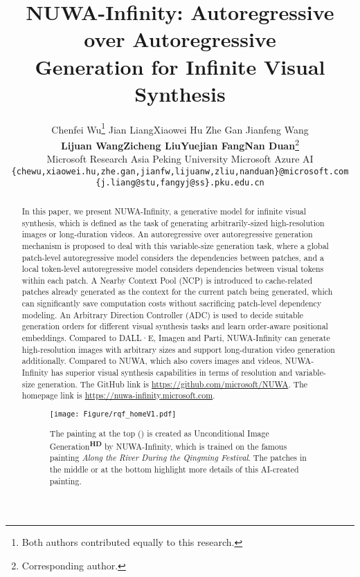 \documentclass{article}
\title{NUWA-Infinity: Autoregressive over Autoregressive\\ Generation for Infinite Visual Synthesis}
\author{Chenfei Wu\thanks{Both authors contributed equally to this research.} \quad Jian Liang\samethanks[1] \quad Xiaowei Hu \quad  Zhe Gan \quad Jianfeng Wang\\ \textbf{Lijuan Wang}\quad  \textbf{Zicheng Liu}\quad  \textbf{Yuejian Fang}\quad \textbf{Nan Duan}\thanks{Corresponding author.} \\
 {Microsoft Research Asia \quad Peking University
 \quad Microsoft Azure AI} \\
{\tt\small\{chewu,xiaowei.hu,zhe.gan,jianfw,lijuanw,zliu,nanduan\}@microsoft.com}\\ {\tt\small\{j.liang@stu,fangyj@ss\}.pku.edu.cn}}
\begin{document}
\maketitle
\vspace{-9mm}

\begin{abstract}
\vspace{-4mm}
In this paper, we present NUWA-Infinity, a generative model for infinite visual synthesis, which is defined as the task of generating arbitrarily-sized high-resolution images or long-duration videos. An autoregressive over autoregressive generation mechanism is proposed to deal with this variable-size generation task, where a global patch-level autoregressive model considers the dependencies between patches, and a local token-level autoregressive model considers dependencies between visual tokens within each patch. A Nearby Context Pool (NCP) is introduced to cache-related patches already generated as the context for the current patch being generated, which can significantly save computation costs without sacrificing patch-level dependency modeling. An Arbitrary Direction Controller (ADC) is used to decide suitable generation orders for different visual synthesis tasks and learn order-aware positional embeddings. Compared to DALL·E, Imagen and Parti, NUWA-Infinity can generate high-resolution images with arbitrary sizes and support long-duration video generation additionally. Compared to NUWA, which also covers images and videos, NUWA-Infinity has superior visual synthesis capabilities in terms of resolution and variable-size generation. The GitHub link is \url{https://github.com/microsoft/NUWA}. The homepage link is \url{https://nuwa-infinity.microsoft.com}.

 






\begin{figure}[htbp]
\vspace{-3mm}
    \centering
    \texttt{[image: Figure/rqf\_homeV1.pdf]}
    \caption{The painting at the top () is created as Unconditional Image Generation\textsuperscript{\textbf{HD}} by NUWA-Infinity, which is trained on the famous painting \textit{Along the River During the Qingming Festival}. The patches in the middle or at the bottom highlight more details of this AI-created painting.}
    \label{fig:qm}
\end{figure}






\end{abstract}
\end{document}
